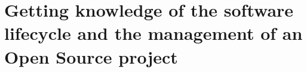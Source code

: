\chapter{Getting knowledge of the software lifecycle and the management of an Open Source project}
\label{ch:sdlc}
